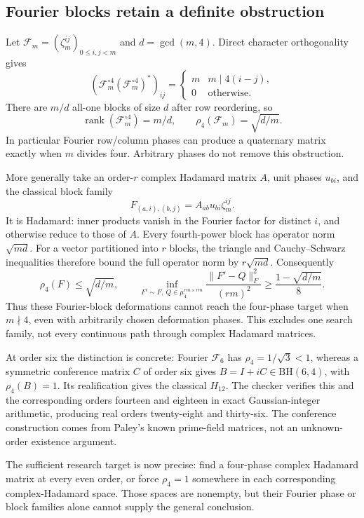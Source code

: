\documentclass[11pt]{article}
\begin{document}
\subsection{Fourier blocks retain a definite obstruction}
Let $\mathcal F_m=(\zeta_m^{ij})_{0\le i,j<m}$ and $d=\gcd(m,4)$.
Direct character orthogonality gives
\[
 (\mathcal F_m^{\circ4}(\mathcal F_m^{\circ4})^*)_{ij}
 =\begin{cases}m&m\mid4(i-j),\\0&\text{otherwise}.\end{cases}
\]
There are $m/d$ all-one blocks of size $d$ after row reordering, so
\[
 \operatorname{rank}(\mathcal F_m^{\circ4})=m/d,\qquad
 \rho_4(\mathcal F_m)=\sqrt{d/m}.
\]
In particular Fourier row/column phases can produce a quaternary
matrix exactly when $m$ divides four. Arbitrary phases do not remove
this obstruction.

More generally take an order-$r$ complex Hadamard matrix $A$,
unit phases $u_{bi}$, and the classical block family
\[
 F_{(a,i),(b,j)}=A_{ab}u_{bi}\zeta_m^{ij}.
\]
It is Hadamard: inner products vanish in the Fourier factor for
distinct $i$, and otherwise reduce to those of $A$.
Every fourth-power block has operator norm $\sqrt{md}$.
For a vector partitioned into $r$ blocks, the triangle and
Cauchy--Schwarz inequalities therefore bound the full operator norm
by $r\sqrt{md}$. Consequently
\[
 \rho_4(F)\le\sqrt{d/m},\qquad
 \inf_{F'\sim F,\ Q\in\mu_4^{rm\times rm}}
 \frac{\|F'-Q\|_F^2}{(rm)^2}
 \ge\frac{1-\sqrt{d/m}}8.
\]
Thus these Fourier-block deformations cannot reach the four-phase
target when $m\nmid4$, even with arbitrarily chosen deformation phases.
This excludes one search family, not every continuous path through
complex Hadamard matrices.

At order six the distinction is concrete: Fourier $\mathcal F_6$
has $\rho_4=1/\sqrt3<1$, whereas a symmetric conference matrix $C$
of order six gives $B=I+iC\in\mathrm{BH}(6,4)$, with $\rho_4(B)=1$.
Its realification gives the classical $H_{12}$. The checker verifies
this and the corresponding orders fourteen and eighteen in exact
Gaussian-integer arithmetic, producing real orders twenty-eight
and thirty-six. The conference construction comes from Paley's
known prime-field matrices, not an unknown-order existence argument.

The sufficient research target is now precise: find a four-phase
complex Hadamard matrix at every even order, or force $\rho_4=1$
somewhere in each corresponding complex-Hadamard space.
Those spaces are nonempty, but their Fourier phase or block
families alone cannot supply the general conclusion.
\end{document}
